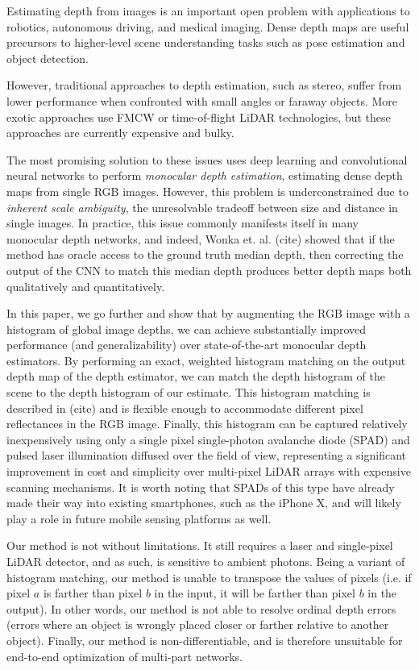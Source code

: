Estimating depth from images is an important open problem with applications
to robotics, autonomous driving, and medical imaging. Dense depth maps are
useful precursors to higher-level scene understanding tasks such as pose
estimation and object detection.

However, traditional approaches to depth estimation, such as stereo, suffer from lower performance
when confronted with small angles or faraway objects.
More exotic approaches use FMCW or time-of-flight LiDAR technologies,
but these approaches are currently expensive and bulky. 

The most promising solution to these issues uses deep learning and 
convolutional neural networks to perform \textit{monocular depth estimation},
estimating dense depth maps from single RGB images. 
However, this problem is underconstrained due to \textit{inherent scale ambiguity}, the unresolvable
tradeoff between size and distance in single images. In practice, this issue commonly
manifests itself in many monocular depth networks, and indeed, 
Wonka et. al. (cite) showed that if the method has oracle access to the ground truth
median depth, then correcting the output of the CNN to match this median
depth produces better depth maps both qualitatively and quantitatively.

In this paper, we go further and show that by augmenting the RGB image with a histogram of
global image depths, we can achieve substantially improved performance
(and generalizability) over state-of-the-art monocular depth
estimators. By performing an exact, weighted histogram matching on the output
depth map of the depth estimator, we can match the depth histogram of the scene
to the depth histogram of our estimate. This histogram matching is described in
(cite) and is flexible enough to accommodate different pixel reflectances in the
RGB image. Finally, this histogram can be captured
relatively inexpensively using only a single pixel single-photon avalanche diode
(SPAD) and pulsed laser illumination diffused over the field of view, 
representing a significant improvement in cost and simplicity over multi-pixel LiDAR
arrays with expensive scanning mechanisms. It is
worth noting that SPADs of this type have already made their way into existing
smartphones, such as the iPhone X, and will likely play a role in future mobile sensing platforms as well.

Our method is not without limitations. It still requires a laser and
single-pixel LiDAR detector, and as such, is sensitive to ambient photons. Being 
a variant of histogram matching, our method is unable to transpose the
values of pixels (i.e. if pixel $a$ is farther
than pixel $b$ in the input, it will be farther than pixel $b$ in the output).
In other words, our method is not able to resolve ordinal depth errors
(errors where an object is wrongly placed closer or farther
relative to another object). Finally, our method is non-differentiable, and is
therefore unsuitable for end-to-end optimization of multi-part networks.

